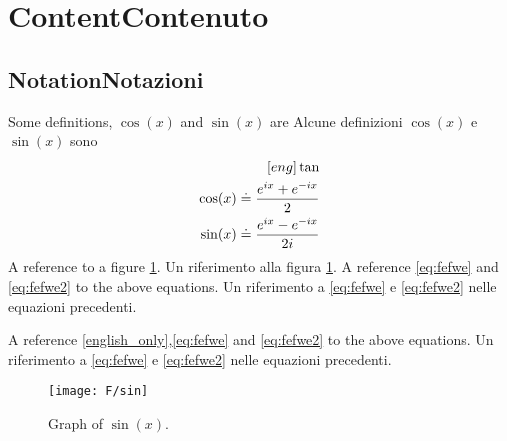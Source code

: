 \section{\ifCDLeng Content\fi \ifCDLita Contenuto\fi}

\subsection{\ifCDLeng Notation\fi \ifCDLita Notazioni\fi}

\begin{Defn}
  \label{defn:1}
  \CDLeng Some definitions, $\cos(x)$ and \(\sin(x)\) are
  \CDLita Alcune definizioni $\cos(x)$ e \(\sin(x)\) sono
  \begin{eqnarray}
    [eng] \tan \label{english_only}\\
    \cos(x) \doteq \frac{e^{ix}+e^{-ix}}{2}  \label{eq:fefwe} \\
    \sin(x) \doteq \frac{e^{ix}-e^{-ix}}{2i} \label{eq:fefwe2}
  \end{eqnarray}
  \CDLeng A reference to a figure \ref{fig:a354}.
  \CDLita Un riferimento alla figura   \ref{fig:a354}.
  \CDLeng A reference \eqref{eq:fefwe} and  \eqref{eq:fefwe2} to the above equations.
  \CDLita Un riferimento a \eqref{eq:fefwe} e  \eqref{eq:fefwe2} nelle equazioni precedenti.
\end{Defn}

\CDLeng A reference \eqref{english_only},\eqref{eq:fefwe} and  \eqref{eq:fefwe2} to the above equations.
\CDLita Un riferimento a \eqref{eq:fefwe} e  \eqref{eq:fefwe2} nelle equazioni precedenti.


\begin{figure}[ht]\label{fig:a354}
  \begin{center}
    \texttt{[image: F/sin]}
    \caption{Graph of \(\sin(x)\).}
  \end{center}
\end{figure}




